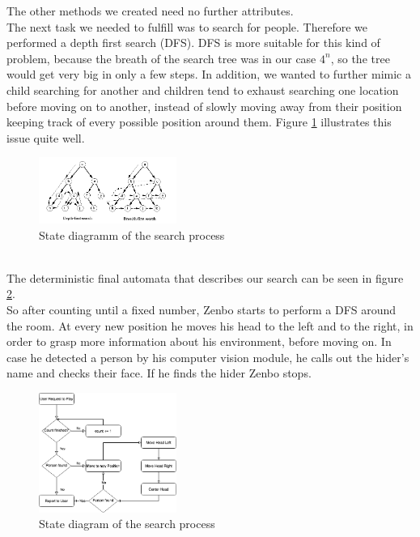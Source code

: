\documentclass[conference]{IEEEtran}
\begin{document}
The other methods we created need no further attributes.\\
The next task we needed to fulfill was to search for people. Therefore we performed a depth first search (DFS).
DFS is more suitable for this kind of problem, because the breath of the search tree was in our case $4^n$, 
so the tree would get very big in only a few steps. In addition, we wanted to further mimic a child searching for another and
children tend to exhaust searching one location before moving on to another, 
instead of slowly moving away from their position keeping track of every possible position around them.
Figure \ref{fig:dfs_vsbfs} illustrates this issue quite well.
\begin{figure}[h]  \label{fig:dfs_vsbfs}
	\begin{center}
		\includegraphics[width=0.4\textwidth]{pics/DFS_VS_BFS.png}
	\end{center}
	\caption{State diagramm of the search process}
\end{figure}\\
The deterministic final automata that describes our search can be seen in figure \ref{fig:zenboSeek}. \\
So after counting until a fixed number, Zenbo starts to perform a DFS around the room.
At every new position he moves his head to the left and to the right, in order to grasp more information about his environment, before moving on. In case he detected a person by 
his computer vision module, he calls out the hider's name and checks their face. If he finds the hider Zenbo stops.
\begin{figure}[h]  \label{fig:zenboSeek}
	\begin{center}
		\includegraphics[width=0.4\textwidth]{pics/ZenboSeek.png}
	\end{center}
	\caption{State diagram of the search process}
\end{figure}
\end{document}
